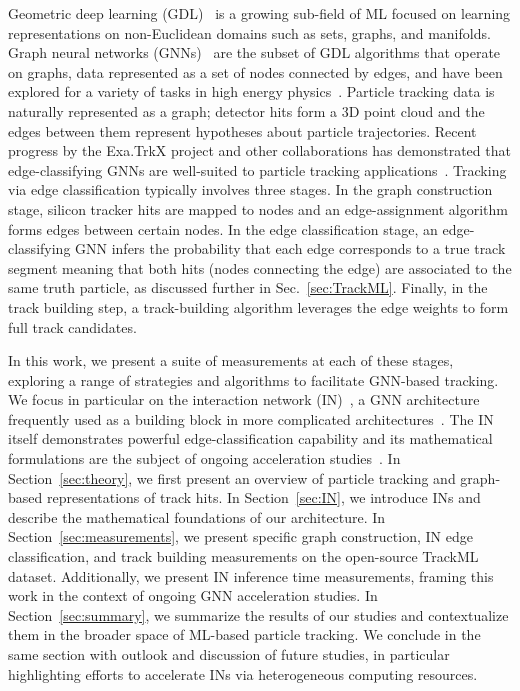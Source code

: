 \documentclass[twocolumn]{svjour3}
\begin{document}
Geometric deep learning (GDL)~\cite{gdl,zhang2020deep,zhou2019graph,wu2019comprehensive} is a growing sub-field of ML focused on learning representations on non-Euclidean domains such as sets, graphs, and manifolds. 
Graph neural networks (GNNs)~\cite{gnnmodel,pointnet,gilmer2017neural,IN,relational,DGCNN} are the subset of GDL algorithms that operate on graphs, data represented as a set of nodes connected by edges, and have been explored for a variety of tasks in high energy physics~\cite{duarte2020graph,Shlomi_2021}. 
Particle tracking data is naturally represented as a graph; detector hits form a 3D point cloud and the edges between them represent hypotheses about particle trajectories. 
Recent progress by the Exa.TrkX project and other collaborations has demonstrated that edge-classifying GNNs are well-suited to particle tracking applications~\cite{heptrkx,exatrkx,IN_fpga}. 
Tracking via edge classification typically involves three stages. 
In the graph construction stage, silicon tracker hits are mapped to nodes and an edge-assignment algorithm forms edges between certain nodes. 
In the edge classification stage, an edge-classifying GNN infers the probability that each edge corresponds to a true track segment meaning that both hits (nodes connecting the edge) are associated to the same truth particle, as discussed further in Sec.~\ref{sec:TrackML}.
Finally, in the track building step, a track-building algorithm leverages the edge weights to form full track candidates.

In this work, we present a suite of measurements at each of these stages, exploring a range of strategies and algorithms to facilitate GNN-based tracking. 
We focus in particular on the interaction network (IN)~\cite{IN}, a GNN architecture frequently used as a building block in more complicated architectures~\cite{heptrkx,IN_fpga,Moreno:2019neq,Moreno:2019bmu}. 
The IN itself demonstrates powerful edge-classification capability and its mathematical formulations are the subject of ongoing acceleration studies~\cite{fpga}. 
In Section~\ref{sec:theory}, we first present an overview of particle tracking and graph-based representations of track hits.
In Section~\ref{sec:IN}, we introduce INs and describe the mathematical foundations of our architecture. 
In Section~\ref{sec:measurements}, we present specific graph construction, IN edge classification, and track building measurements on the open-source TrackML dataset. 
Additionally, we present IN inference time measurements, framing this work in the context of ongoing GNN acceleration studies.  
In Section~\ref{sec:summary}, we summarize the results of our studies and contextualize them in the broader space of ML-based particle tracking. 
We conclude in the same section with outlook and discussion of future studies, in particular highlighting efforts to accelerate INs via heterogeneous computing resources. 
\end{document}
